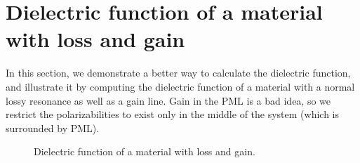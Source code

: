 \section{Dielectric function of a material with loss and gain}

\begin{comment}
#include <stdio.h>
#include <stdlib.h>
#include <signal.h>

#include "dactyl.h"

const int rad = 10;
const int m = 0;
const double eps_value = 2.25;
const double fmin = 0.05;

const double pml = 1.0;
const int npml = (int)(0.5+pml*rad);
const double zsize = 2*pml+10/(double)rad;//+1.0/freq;
const double rmax  = 6/(double)rad;
const double zmiddle = zsize/2;
const double sourceloc = zmiddle - 4/(double)rad;

const double r_look = 1.5/rad, z_look = zmiddle, d = 1.0/rad;

complex<double> source_sharp(double r) {
  double sig = 1.0/rad;
  double dr = r - rmax*.5;
  if (fabs(r) >= rmax) return 0.0;
  return exp(-dr*dr/(2*sig*sig))/sqrt(sig);
}
double eps(double r, double z) { return eps_value; }
double one_in_middle(double r, double z) {
  const double midmax = r_look+2.0/(double)rad;
  const double midwid = 2/(double)rad;
  if (r <= midmax && z >= zmiddle-midwid && z < zmiddle+midwid) {
    return 1;
  } else {
    return 0;
  }
}

int main(int argc, char **argv) {
  deal_with_ctrl_c();
  const char *dirname = make_output_directory(argv[0]);
  printf("Using pml of %
  printf("Using an rmax of %
  mat ma(eps, rmax + pml, zsize, rad);
  printf("I expect %
  ma.set_output_directory(dirname);
\end{comment}

In this section, we demonstrate a better way to calculate the dielectric
function, and illustrate it by computing the dielectric function of a
material with a normal lossy resonance as well as a gain line.  Gain in the
PML is a bad idea, so we restrict the polarizabilities to exist only in the
middle of the system (which is surrounded by PML).

\begin{figure}
\label{lossgain_epsilon}
\caption{Dielectric function of a material with loss and gain.}
\end{figure}


